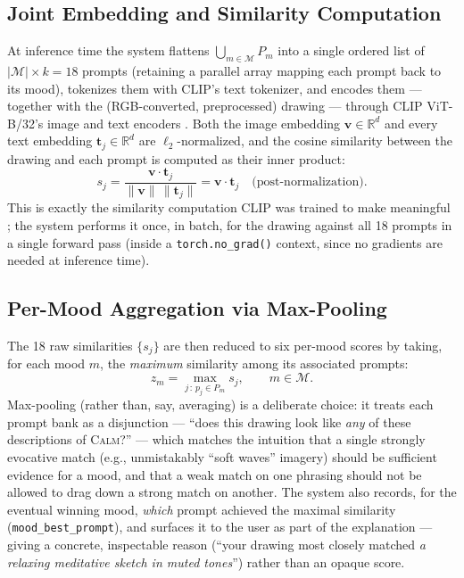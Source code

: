 \documentclass[10pt,twocolumn,letterpaper]{article}
\begin{document}
\subsection{Joint Embedding and Similarity Computation}

At inference time the system flattens $\bigcup_{m \in \mathcal{M}} P_m$ into a single ordered list of $|\mathcal{M}| \times k = 18$ prompts (retaining a parallel array mapping each prompt back to its mood), tokenizes them with CLIP's text tokenizer, and encodes them --- together with the (RGB-converted, preprocessed) drawing --- through CLIP ViT-B/32's image and text encoders \cite{radford2021clip}. Both the image embedding $\mathbf{v} \in \mathbb{R}^d$ and every text embedding $\mathbf{t}_j \in \mathbb{R}^d$ are $\ell_2$-normalized, and the cosine similarity between the drawing and each prompt is computed as their inner product:
\begin{equation}
    s_j = \frac{\mathbf{v} \cdot \mathbf{t}_j}{\lVert \mathbf{v} \rVert \, \lVert \mathbf{t}_j \rVert} = \mathbf{v} \cdot \mathbf{t}_j \quad \text{(post-normalization)}.
    \label{eq:cosine}
\end{equation}
This is exactly the similarity computation CLIP was trained to make meaningful \cite{radford2021clip}; the system performs it once, in batch, for the drawing against all 18 prompts in a single forward pass (inside a \texttt{torch.no\_grad()} context, since no gradients are needed at inference time).

\subsection{Per-Mood Aggregation via Max-Pooling}

The 18 raw similarities $\{s_j\}$ are then reduced to six per-mood scores by taking, for each mood $m$, the \emph{maximum} similarity among its associated prompts:
\begin{equation}
    z_m = \max_{j \,:\, p_j \in P_m} s_j, \qquad m \in \mathcal{M}.
    \label{eq:maxpool}
\end{equation}
Max-pooling (rather than, say, averaging) is a deliberate choice: it treats each prompt bank as a disjunction --- ``does this drawing look like \emph{any} of these descriptions of \textsc{Calm}?'' --- which matches the intuition that a single strongly evocative match (e.g., unmistakably ``soft waves'' imagery) should be sufficient evidence for a mood, and that a weak match on one phrasing should not be allowed to drag down a strong match on another. The system also records, for the eventual winning mood, \emph{which} prompt achieved the maximal similarity (\texttt{mood\_best\_prompt}), and surfaces it to the user as part of the explanation --- giving a concrete, inspectable reason (``your drawing most closely matched \emph{a relaxing meditative sketch in muted tones}'') rather than an opaque score.
\end{document}
